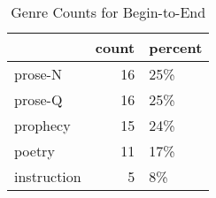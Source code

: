 \begin{table}[htbp!]
\centering
\caption{Genre Counts for Begin-to-End}
\label{table:b2e_gen_cp}
\begin{tabular}{lrl}
\toprule
{} &  count & percent \\
\midrule
prose-N     &     16 &     25\% \\
prose-Q     &     16 &     25\% \\
prophecy    &     15 &     24\% \\
poetry      &     11 &     17\% \\
instruction &      5 &      8\% \\
\bottomrule
\end{tabular}
\end{table}
